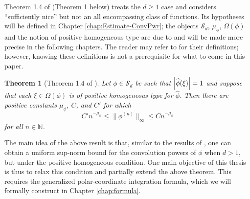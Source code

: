 \documentclass[11pt, letter]{book}
\newtheorem{theorem}{Theorem}[section]
\begin{document}
\noindent Theorem 1.4 of \cite{randles_convolution_2017} (Theorem \ref{thm:d} below) treats the $d\geq 1$ case and considers ``sufficiently nice'' but not an all encompassing class of functions. Its hypotheses will be defined in Chapter \ref{chap:Estimate-ConvPwr}; the objects $\mathcal{S}_d$, $\mu_\phi$, $\Omega(\phi)$ and the notion of positive homogeneous type are due to \cite{randles_convolution_2017} and will be made more precise in the following chapters. The reader may refer to \cite{randles_convolution_2017} for their definitions; however, knowing these definitions is not a prerequisite for what to come in this paper.

\begin{framed}
\begin{theorem}[Theorem 1.4 of \cite{randles_convolution_2017}]\label{thm:d}
Let $\phi \in \mathcal{S}_d$ be such that $\abs{\widehat{\phi}(\xi)} = 1$ and suppose that each $\xi \in \Omega(\phi)$ is of positive homogeneous type for $\widehat{\phi}$. Then there are positive constants $\mu_\phi$, $C$, and $C'$ for which 
\begin{equation*}
    C'n^{-\mu_\phi} \leq \| \phi^{(n)} \|_\infty \leq C n^{-\mu_\phi}
\end{equation*}
for all $n\in \mathbb{N}$.
\end{theorem}
\end{framed}

\noindent The main idea of the above result is that, similar to the results of \cite{randles_convolution_2015}, one can obtain a uniform sup-norm bound for the convolution powers of $\phi$ when $d>1$, but under the positive homogeneous condition. One main objective of this thesis is thus to relax this condition and partially extend the above theorem. This requires the generalized polar-coordinate integration formula, which we will formally construct in Chapter \ref{chap:formula}. 
\end{document}
